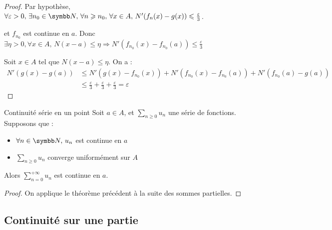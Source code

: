 \begin{proof}
    Par hypothèse, $\forall \varepsilon > 0, \, \exists n_0 \in \N, \, \forall n \geqslant n_0, \, \forall x \in A, \, N'(f_n(x) - g(x)) \leqslant \frac \varepsilon 3$.

    et $f_{n_0}$ est continue en $a$. Donc $\exists \eta > 0, \forall x \in A, \, N(x - a) \leqslant \eta \Rightarrow N'(f_{n_0}(x) - f_{n_0}(a)) \leqslant \frac \varepsilon 3$

    Soit $x \in A$ tel que $N(x - a) \leqslant \eta$. On a :
    \begin{align}
        N'(g(x) - g(a)) & \leqslant N'(g(x) - f_{n_0}(x)) + N'(f_{n_0}(x) - f_{n_0}(a)) + N'(f_{n_0}(a) - g(a)) \\
        & \leqslant \frac \varepsilon 3 + \frac \varepsilon 3 + \frac \varepsilon 3 = \varepsilon
    \end{align}
\end{proof}

\begin{theoreme}{Continuité série en un point}{}
    Soit $a \in A$, et $\displaystyle \sum_{n \geqslant 0} u_n$ une série de fonctions. Supposons que : 
    \begin{itemize}
        \item $\forall n \in \N, \, u_n$ est continue en $a$
        \item $\displaystyle \sum_{n \geqslant 0} u_n$ converge uniformément sur $A$ 
    \end{itemize}
    Alors $\displaystyle \sum_{n = 0}^{+ \infty} u_n$ est continue en $a$.
\end{theoreme}

\begin{proof}
    On applique le théorème précédent à la suite des sommes partielles.
\end{proof}

\subsection{Continuité sur une partie }

